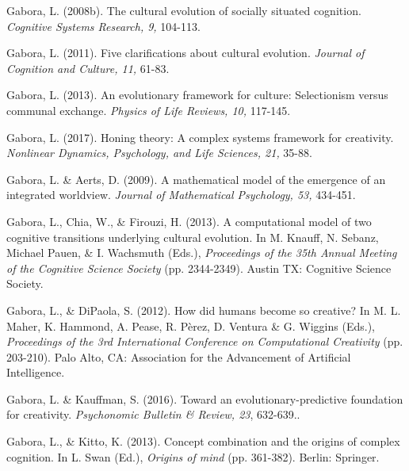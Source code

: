 \documentclass[a4paper,12pt,man,british]{apa6}
\begin{document}
\begin{description}
\item Gabora, L. (2008b). The cultural evolution of socially situated cognition. \emph{Cognitive Systems Research, 9,} 104-113. 

\item Gabora, L. (2011). Five clarifications about cultural evolution. \emph{Journal of Cognition and Culture, 11,} 61-83. 

\item Gabora, L. (2013). An evolutionary framework for culture: Selectionism versus communal exchange. \emph{Physics of Life Reviews, 10,} 117-145. 

\item Gabora, L. (2017). Honing theory: A complex systems framework for creativity. \emph{Nonlinear Dynamics, Psychology, and Life Sciences, 21,} 35-88. 

\item Gabora, L. \& Aerts, D. (2009). A mathematical model of the emergence of an integrated worldview. \emph{Journal of Mathematical Psychology, 53,} 434-451.

\item Gabora, L., Chia, W., \& Firouzi, H. (2013). A computational model of two cognitive transitions underlying cultural evolution. In M. Knauff, N. Sebanz, Michael Pauen, \& I. Wachsmuth (Eds.), \emph{ Proceedings of the 35th Annual Meeting of the Cognitive Science Society} (pp. 2344-2349). Austin TX: Cognitive Science Society. 

\item Gabora, L., \& DiPaola, S. (2012). How did humans become so creative? In M. L. Maher, K. Hammond, A. Pease, R. Pèrez, D. Ventura \& G. Wiggins (Eds.), \emph{Proceedings of the 3rd International Conference on Computational Creativity} (pp. 203-210). Palo Alto, CA: Association for the Advancement of Artificial Intelligence. 


\item Gabora, L. \& Kauffman, S. (2016). Toward an evolutionary-predictive foundation for creativity. \emph{Psychonomic Bulletin \& Review, 23}, 632-639..

\item Gabora, L., \& Kitto, K. (2013). Concept combination and the origins of complex cognition. In 
L. Swan (Ed.), \emph{Origins of mind} (pp. 361-382). Berlin: Springer.


\end{description}
\end{document}
